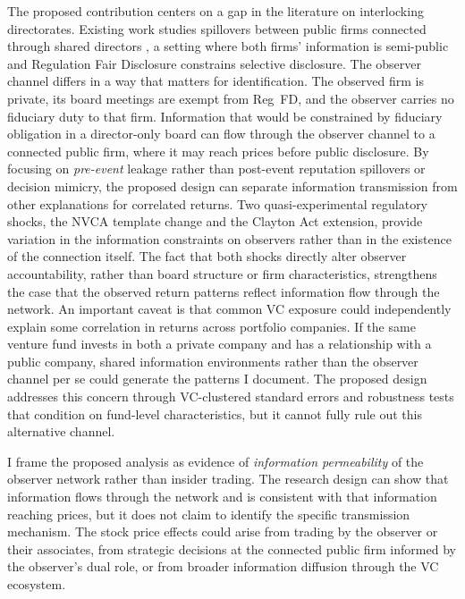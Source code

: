 The proposed contribution centers on a gap in the literature on interlocking directorates. Existing work studies spillovers between public firms connected through shared directors \cite{kang2008director,shi2025shared,fracassi2017corporate}, a setting where both firms' information is semi-public and Regulation Fair Disclosure constrains selective disclosure. The observer channel differs in a way that matters for identification. The observed firm is private, its board meetings are exempt from Reg~FD, and the observer carries no fiduciary duty to that firm. Information that would be constrained by fiduciary obligation in a director-only board can flow through the observer channel to a connected public firm, where it may reach prices before public disclosure. By focusing on \textit{pre-event} leakage rather than post-event reputation spillovers or decision mimicry, the proposed design can separate information transmission from other explanations for correlated returns. Two quasi-experimental regulatory shocks, the NVCA template change and the Clayton Act extension, provide variation in the information constraints on observers rather than in the existence of the connection itself. The fact that both shocks directly alter observer accountability, rather than board structure or firm characteristics, strengthens the case that the observed return patterns reflect information flow through the network. An important caveat is that common VC exposure could independently explain some correlation in returns across portfolio companies. If the same venture fund invests in both a private company and has a relationship with a public company, shared information environments rather than the observer channel per se could generate the patterns I document. The proposed design addresses this concern through VC-clustered standard errors and robustness tests that condition on fund-level characteristics, but it cannot fully rule out this alternative channel.

I frame the proposed analysis as evidence of \textit{information permeability} of the observer network rather than insider trading. The research design can show that information flows through the network and is consistent with that information reaching prices, but it does not claim to identify the specific transmission mechanism. The stock price effects could arise from trading by the observer or their associates, from strategic decisions at the connected public firm informed by the observer's dual role, or from broader information diffusion through the VC ecosystem.
